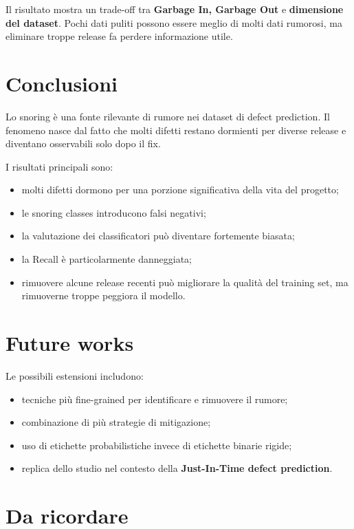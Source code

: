 \begin{notaprof}
Il risultato mostra un trade-off tra \textbf{Garbage In, Garbage Out} e \textbf{dimensione del dataset}. Pochi dati puliti possono essere meglio di molti dati rumorosi, ma eliminare troppe release fa perdere informazione utile.
\end{notaprof}

\section{Conclusioni}

Lo snoring è una fonte rilevante di rumore nei dataset di defect prediction. Il fenomeno nasce dal fatto che molti difetti restano dormienti per diverse release e diventano osservabili solo dopo il fix.

I risultati principali sono:

\begin{itemize}
    \item molti difetti dormono per una porzione significativa della vita del progetto;
    \item le snoring classes introducono falsi negativi;
    \item la valutazione dei classificatori può diventare fortemente biasata;
    \item la Recall è particolarmente danneggiata;
    \item rimuovere alcune release recenti può migliorare la qualità del training set, ma rimuoverne troppe peggiora il modello.
\end{itemize}

\section{Future works}

Le possibili estensioni includono:

\begin{itemize}
    \item tecniche più fine-grained per identificare e rimuovere il rumore;
    \item combinazione di più strategie di mitigazione;
    \item uso di etichette probabilistiche invece di etichette binarie rigide;
    \item replica dello studio nel contesto della \textbf{Just-In-Time defect prediction}.
\end{itemize}

\section{Da ricordare}

